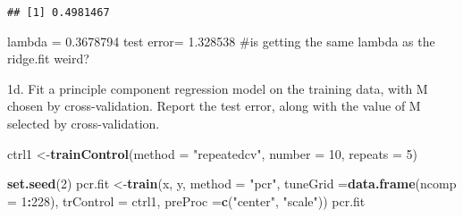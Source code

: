 \documentclass[]{article}
\newenvironment{Shaded}{\begin{snugshade}}{\end{snugshade}}
\newcommand{\CommentTok}[1]{\textcolor[rgb]{0.56,0.35,0.01}{\textit{#1}}}
\newcommand{\DataTypeTok}[1]{\textcolor[rgb]{0.13,0.29,0.53}{#1}}
\newcommand{\DecValTok}[1]{\textcolor[rgb]{0.00,0.00,0.81}{#1}}
\newcommand{\KeywordTok}[1]{\textcolor[rgb]{0.13,0.29,0.53}{\textbf{#1}}}
\newcommand{\NormalTok}[1]{#1}
\newcommand{\OperatorTok}[1]{\textcolor[rgb]{0.81,0.36,0.00}{\textbf{#1}}}
\newcommand{\StringTok}[1]{\textcolor[rgb]{0.31,0.60,0.02}{#1}}
\begin{document}
\begin{Shaded}
\end{Shaded}

\begin{verbatim}
## [1] 0.4981467
\end{verbatim}

lambda = 0.3678794 test error= 1.328538 \#is getting the same lambda as
the ridge.fit weird?

1d. Fit a principle component regression model on the training data,
with M chosen by cross-validation. Report the test error, along with the
value of M selected by cross-validation.

\begin{Shaded}
\begin{Highlighting}[]
\NormalTok{ctrl1 <-}\KeywordTok{trainControl}\NormalTok{(}\DataTypeTok{method =} \StringTok{"repeatedcv"}\NormalTok{, }\DataTypeTok{number =} \DecValTok{10}\NormalTok{, }\DataTypeTok{repeats =} \DecValTok{5}\NormalTok{)}

\KeywordTok{set.seed}\NormalTok{(}\DecValTok{2}\NormalTok{)}
\NormalTok{pcr.fit <-}\KeywordTok{train}\NormalTok{(x, y,}
                \DataTypeTok{method =} \StringTok{"pcr"}\NormalTok{,}
                \DataTypeTok{tuneGrid  =}\KeywordTok{data.frame}\NormalTok{(}\DataTypeTok{ncomp =} \DecValTok{1}\OperatorTok{:}\DecValTok{228}\NormalTok{), }
                \DataTypeTok{trControl =}\NormalTok{ ctrl1,}
               \DataTypeTok{preProc =}\KeywordTok{c}\NormalTok{(}\StringTok{"center"}\NormalTok{, }\StringTok{"scale"}\NormalTok{))}
\NormalTok{pcr.fit }
\end{Highlighting}
\end{Shaded}
\end{document}
